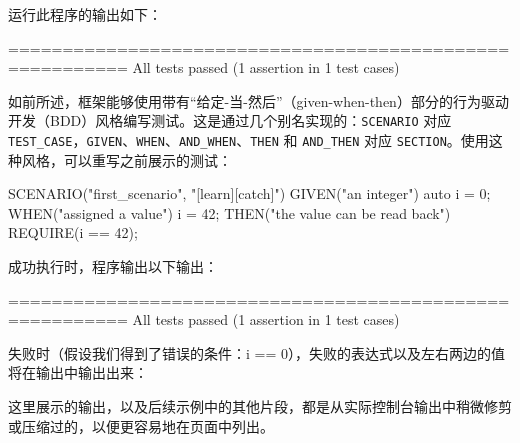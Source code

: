 运行此程序的输出如下：

\begin{shell}
=========================================================
All tests passed (1 assertion in 1 test cases)
\end{shell}


如前所述，框架能够使用带有“给定-当-然后”（given-when-then）部分的行为驱动开发（BDD）风格编写测试。这是通过几个别名实现的：\verb|SCENARIO| 对应 \verb|TEST_CASE|，\verb|GIVEN|、\verb|WHEN|、\verb|AND_WHEN|、\verb|THEN| 和 \verb|AND_THEN| 对应 \verb|SECTION|。使用这种风格，可以重写之前展示的测试：

\begin{cpp}
SCENARIO("first_scenario", "[learn][catch]")
{
    GIVEN("an integer")
    {
        auto i = 0;
        WHEN("assigned a value")
        {
            i = 42;
            THEN("the value can be read back")
            {
                REQUIRE(i == 42);
            }
        }
    }
}
\end{cpp}

成功执行时，程序输出以下输出：

\begin{shell}
=========================================================
All tests passed (1 assertion in 1 test cases)
\end{shell}

失败时（假设我们得到了错误的条件：i == 0），失败的表达式以及左右两边的值将在输出中输出出来：


这里展示的输出，以及后续示例中的其他片段，都是从实际控制台输出中稍微修剪或压缩过的，以便更容易地在页面中列出。


